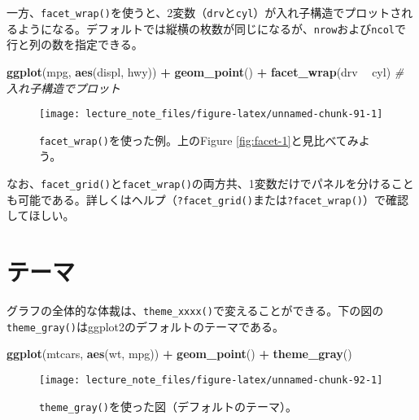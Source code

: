 \documentclass[]{book}
\newenvironment{Shaded}{\begin{snugshade}}{\end{snugshade}}
\newcommand{\KeywordTok}[1]{\textcolor[rgb]{0.13,0.29,0.53}{\textbf{#1}}}
\newcommand{\StringTok}[1]{\textcolor[rgb]{0.31,0.60,0.02}{#1}}
\newcommand{\CommentTok}[1]{\textcolor[rgb]{0.56,0.35,0.01}{\textit{#1}}}
\newcommand{\OperatorTok}[1]{\textcolor[rgb]{0.81,0.36,0.00}{\textbf{#1}}}
\newcommand{\NormalTok}[1]{#1}
\begin{document}
一方、\texttt{facet\_wrap()}を使うと、2変数（\texttt{drv}と\texttt{cyl}）が入れ子構造でプロットされるようになる。デフォルトでは縦横の枚数が同じになるが、\texttt{nrow}および\texttt{ncol}で行と列の数を指定できる。




\begin{Shaded}
\begin{Highlighting}[]
\KeywordTok{ggplot}\NormalTok{(mpg, }\KeywordTok{aes}\NormalTok{(displ, hwy)) }\OperatorTok{+}
\StringTok{  }\KeywordTok{geom_point}\NormalTok{() }\OperatorTok{+}
\StringTok{  }\KeywordTok{facet_wrap}\NormalTok{(drv }\OperatorTok{~}\StringTok{ }\NormalTok{cyl) }\CommentTok{# 入れ子構造でプロット}
\end{Highlighting}
\end{Shaded}

\begin{figure}

{\centering \texttt{[image: lecture\_note\_files/figure-latex/unnamed-chunk-91-1]} 

}

\caption{\texttt{facet\_wrap()}を使った例。上のFigure
\ref{fig:facet-1}と見比べてみよう。}\label{fig:unnamed-chunk-91}
\end{figure}

なお、\texttt{facet\_grid()}と\texttt{facet\_wrap()}の両方共、1変数だけでパネルを分けることも可能である。詳しくはヘルプ（\texttt{?facet\_grid()}または\texttt{?facet\_wrap()}）で確認してほしい。

\section{テーマ}

グラフの全体的な体裁は、\texttt{theme\_xxxx()}で変えることができる。下の図の\texttt{theme\_gray()}はggplot2のデフォルトのテーマである。



\begin{Shaded}
\begin{Highlighting}[]
\KeywordTok{ggplot}\NormalTok{(mtcars, }\KeywordTok{aes}\NormalTok{(wt, mpg)) }\OperatorTok{+}
\StringTok{  }\KeywordTok{geom_point}\NormalTok{() }\OperatorTok{+}
\StringTok{  }\KeywordTok{theme_gray}\NormalTok{()}
\end{Highlighting}
\end{Shaded}

\begin{figure}

{\centering \texttt{[image: lecture\_note\_files/figure-latex/unnamed-chunk-92-1]} 

}

\caption{\texttt{theme\_gray()}を使った図（デフォルトのテーマ）。}\label{fig:unnamed-chunk-92}
\end{figure}
\end{document}
